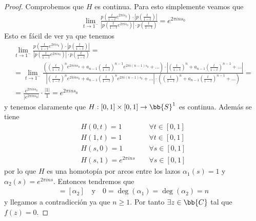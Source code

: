 \begin{teo}
\begin{proof}
        Comprobemos que $H$ es continua. Para esto simplemente veamos que 
        \begin{gather*}
            \lim_{t\to 1^-}\frac{p\left(\frac{t}{1-t} e^{2\pi i s_0}\right) \cdot \left|p\left(\frac{t}{1-t}\right)\right|}{\left|p\left(\frac{t}{1-t} e^{2\pi i s_0}\right)\right| \cdot p\left(\frac{t}{1-t}\right)} = e^{2 \pi i n s_0}
        \end{gather*}
        Esto es fácil de ver ya que tenemos
        \begin{gather*}
            \lim_{t\to 1^-}\frac{p\left(\frac{t}{1-t} e^{2\pi i s_0}\right) \cdot \left|p\left(\frac{t}{1-t}\right)\right|}{\left|p\left(\frac{t}{1-t} e^{2\pi i s_0}\right)\right| \cdot p\left(\frac{t}{1-t}\right)} =\\
            = \lim_{t\to 1^-} \frac{\left(\left(\frac{t}{1-t}\right)^n e^{2\pi i n s_0} + a_{n-1} \left(\frac{t}{1-t}\right)^{n-1} e^{2\pi i (n-1) s_0} + \dots\right) \cdot \left|\left(\frac{t}{1-t}\right)^n + a_{n-1} \left(\frac{t}{1-t}\right)^{n-1}  + \dots\right|  }%
            {\left|\left(\frac{t}{1-t}\right)^n e^{2\pi i n s_0} + a_{n-1} \left(\frac{t}{1-t}\right)^n e^{2\pi i (n-1) s_0} + \dots\right| \cdot \left(\left(\frac{t}{1-t}\right)^n + a_{n-1} \left(\frac{t}{1-t}\right)^{n-1}  + \dots\right)} = \\
            = \frac{e^{2\pi i n s_0}}{|e^{2\pi i n s_0|}} \cdot \frac{|1|}{1} = e^{2\pi i n s_0}
        \end{gather*}
        y tenemos claramente que $H:[0,1]\times [0,1]\to \bb{S}^1$ es continua. Además se tiene 
        \begin{align*}
            H(0,t) = 1\ \ \ \ \ & \forall t\in [0,1]\\
            H(1,t) = 1\ \ \ \ \  & \forall t\in [0,1]\\
            H(s,0) = 1\ \ \ \ \  & \forall s\in [0,1]\\
            H(s,1) = e^{2\pi i n s} \ \ \ \ \ & \forall s\in [0,1]
        \end{align*}
        por lo que $H$ es una homotopía por arcos entre los lazos $\alpha_1(s) = 1$ y $\alpha_2(s) = e^{2\pi i n s}$. Entonces tendremos que 
        \begin{gather*}
            [\alpha_1] = [\alpha_2] \ \ \ \text{ y } \ \ \ 0 = \deg(\alpha_1) = \deg(\alpha_2) = n
        \end{gather*}
        y llegamos a contradicción ya que $n\geq 1$. Por tanto $\exists z \in \bb{C}$ tal que $f(z) = 0$.
    \end{proof}
\end{teo}


